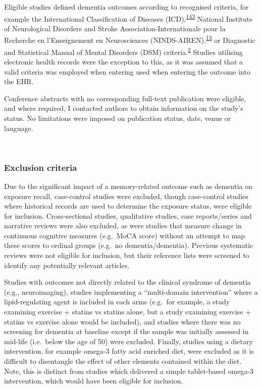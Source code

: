 \documentclass[a4paper, twoside]{templates/ociamthesis}
\begin{document}
Eligible studies defined dementia outcomes according to recognised criteria, for example the International Classification of Diseases (ICD),\textsuperscript{\protect\hyperlink{ref-organizationwho1993}{143}} National Institute of Neurological Disorders and Stroke Association-Internationale pour la Recherche en l'Enseignement en Neurosciences (NINDS-AIREN),\textsuperscript{\protect\hyperlink{ref-roman1993}{13}} or Diagnostic and Statistical Manual of Mental Disorders (DSM) criteria.\textsuperscript{\protect\hyperlink{ref-edition2013}{3}} Studies utilising electronic health records were the exception to this, as it was assumed that a valid criteria was employed when entering used when entering the outcome into the EHR.

Conference abstracts with no corresponding full-text publication were eligible, and where required, I contacted authors to obtain information on the study's status. No limitations were imposed on publication status, date, venue or language.

~

\hypertarget{exclusion-criteria}{%
\subsubsection{Exclusion criteria}\label{exclusion-criteria}}

Due to the significant impact of a memory-related outcome such as dementia on exposure recall, case-control studies were excluded, though case-control studies where historical records are used to determine the exposure status, were eligible for inclusion. Cross-sectional studies, qualitative studies, case reports/series and narrative reviews were also excluded, as were studies that measure change in continuous cognitive measures (e.g.~MoCA score) without an attempt to map these scores to ordinal groups (e.g.~no dementia/dementia). Previous systematic reviews were not eligible for inclusion, but their reference lists were screened to identify any potentially relevant articles.

Studies with outcomes not directly related to the clinical syndrome of dementia (e.g., neuroimaging), studies implementing a ``multi-domain intervention'' where a lipid-regulating agent is included in each arms (e.g.~for example, a study examining exercise + statins vs statins alone, but a study examining exercise + statins vs exercise alone would be included), and studies where there was no screening for dementia at baseline except if the sample was initially assessed in mid-life (i.e.~below the age of 50) were excluded. Finally, studies using a dietary intervention, for example omega-3 fatty acid enriched diet, were excluded as it is difficult to disentangle the effect of other elements contained within the diet. Note, this is distinct from studies which delivered a simple tablet-based omega-3 intervention, which would have been eligible for inclusion.
\end{document}
